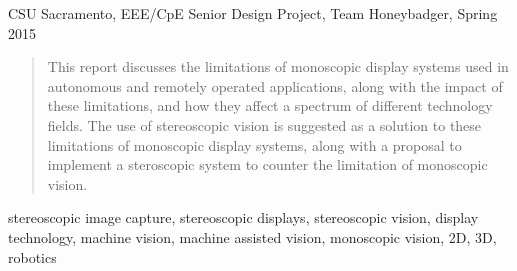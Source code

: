 \documentclass[12pt, journal]{IEEEtran}
\begin{document}
%
{CSU Sacramento, EEE/CpE Senior Design Project, Team Honeybadger, Spring 2015}
% 




\maketitle

\begin{abstract}

This report discusses the limitations of monoscopic display systems used in autonomous and remotely operated applications, along with the impact of these limitations, and how they affect a spectrum of different technology fields. The use of stereoscopic vision is suggested as a solution to these limitations of monoscopic display systems, along with a proposal to implement a steroscopic system to counter the limitation of monoscopic vision.
\end{abstract}

\begin{IEEEkeywords}
stereoscopic image capture, stereoscopic displays, stereoscopic vision, display technology, machine vision, machine assisted vision, monoscopic vision, 2D, 3D, robotics
\end{IEEEkeywords}



%
\IEEEpeerreviewmaketitle
\end{document}
